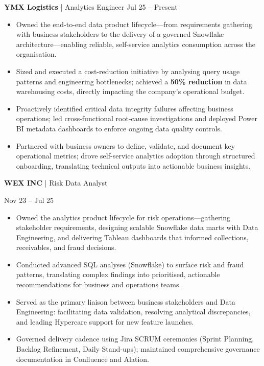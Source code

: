 \documentclass[9pt, letterpaper]{article}
\begin{document}
	\noindent \textbf{YMX Logistics} | Analytics Engineer \hfill Jul 25 -- Present
	\begin{itemize}[noitemsep, topsep=1pt, leftmargin=1.5em, rightmargin=0.5cm]
		\item Owned the end-to-end data product lifecycle---from requirements gathering with business stakeholders to the delivery of a governed Snowflake architecture---enabling reliable, self-service analytics consumption across the organisation.
		\item Sized and executed a cost-reduction initiative by analysing query usage patterns and engineering bottlenecks; achieved a \textbf{50\% reduction} in data warehousing costs, directly impacting the company's operational budget.
		\item Proactively identified critical data integrity failures affecting business operations; led cross-functional root-cause investigations and deployed Power BI metadata dashboards to enforce ongoing data quality controls.
		\item Partnered with business owners to define, validate, and document key operational metrics; drove self-service analytics adoption through structured onboarding, translating technical outputs into actionable business insights.
	\end{itemize}

	\noindent \begin{minipage}[t]{0.75\textwidth}
		\textbf{WEX INC} | Risk Data Analyst
	\end{minipage}
	\begin{minipage}[t]{0.25\textwidth}
		\raggedleft Nov 23 -- Jul 25
	\end{minipage}

	\begin{itemize}[noitemsep, topsep=1pt, leftmargin=1.5em, rightmargin=0.5cm]
		\item Owned the analytics product lifecycle for risk operations---gathering stakeholder requirements, designing scalable Snowflake data marts with Data Engineering, and delivering Tableau dashboards that informed collections, receivables, and fraud decisions.
		\item Conducted advanced SQL analyses (Snowflake) to surface risk and fraud patterns, translating complex findings into prioritised, actionable recommendations for business and operations teams.
		\item Served as the primary liaison between business stakeholders and Data Engineering: facilitating data validation, resolving analytical discrepancies, and leading Hypercare support for new feature launches.
		\item Governed delivery cadence using Jira SCRUM ceremonies (Sprint Planning, Backlog Refinement, Daily Stand-ups); maintained comprehensive governance documentation in Confluence and Alation.
	\end{itemize}
\end{document}
